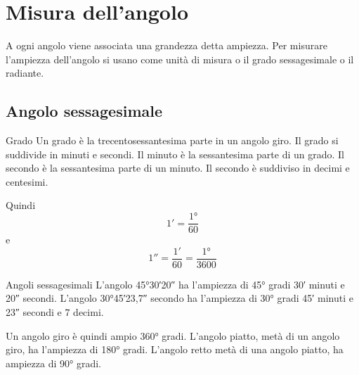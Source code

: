 \section{Misura dell'angolo}
\label{sec:MisuraAngoloGonio}

A ogni angolo viene associata una grandezza detta ampiezza.  Per misurare l'ampiezza dell'angolo si usano come unità di misura o il grado sessagesimale  o il radiante.
\subsection{Angolo sessagesimale}
\begin{definizionet}{Grado}{}
Un grado è la trecentosessantesima parte in un angolo giro. Il grado si suddivide in minuti e  secondi. Il minuto è la sessantesima parte di un grado. Il secondo è la sessantesima parte di un minuto. Il secondo è suddiviso in decimi e centesimi.
\end{definizionet}
 Quindi \[\ang{;1;}=\dfrac{\ang{1}}{60}\] e  \[\ang{;;1}=\dfrac{\ang{;1;}}{60}=\dfrac{\ang{1}}{3600}\]
\begin{esempiot}{Angoli sessagesimali}{}
L'angolo  \ang{45;30;20}  ha l'ampiezza di \ang{45} gradi \ang{;30;} minuti e \ang{;;20} secondi. L'angolo \ang{30;45;23,7} secondo ha l'ampiezza di \ang{30} gradi \ang{;45;} minuti e \ang{;;23} secondi e $7$ decimi.
\end{esempiot}
Un angolo giro è quindi ampio \ang{360} gradi. L'angolo piatto,  metà di un angolo giro, ha l'ampiezza di \ang{180} gradi. L'angolo retto  metà di una angolo piatto, ha ampiezza di \ang{90} gradi.

